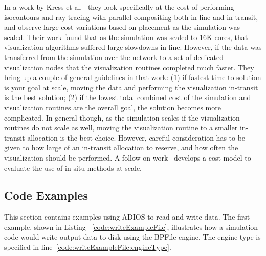 In a work by Kress et al.~\cite{kress2019comparing} they look specifically at the cost of performing isocontours and ray tracing with parallel compositing both in-line and in-transit, and observe large cost variations based on placement as the simulation was scaled. Their work found that as the simulation was scaled to 16K cores, that visualization algorithms suffered large slowdowns in-line. However, if the data was transferred from the simulation over the network to a set of dedicated visualization nodes that the visualization routines completed much faster. They bring up a couple of general guidelines in that work: (1) if fastest time to solution is your goal at scale, moving the data and performing the visualization in-transit is the best solution; (2) if the lowest total combined cost of the simulation and visualization routines are the overall goal, the solution becomes more complicated. In general though, as the simulation scales if the visualization routines do not scale as well, moving the visualization routine to a smaller in-transit allocation is the best choice. However, careful consideration has to be given to how large of an in-transit allocation to reserve, and how often the visualization should be performed. A follow on work~\cite{kress2020Cost} develops a cost model to evaluate the use of in situ methods at scale.


\subsection{Code Examples}
\label{sec:adios:code}
This section contains examples using ADIOS to read and write data.
The first example, shown in Listing ~\ref{code:writeExampleFile}, illustrates how a simulation code would write output data to disk using the BPFile engine.
The engine type is specified in line~\ref{code:writeExampleFile:engineType}.


